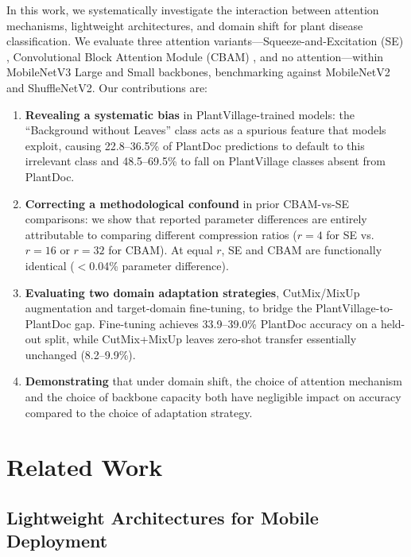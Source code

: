 \documentclass[preprint,12pt]{elsarticle}
\begin{document}
In this work, we systematically investigate the interaction between attention mechanisms, lightweight architectures, and domain shift for plant disease classification. We evaluate three attention variants—Squeeze-and-Excitation (SE) \cite{Hu2018}, Convolutional Block Attention Module (CBAM) \cite{Woo2018}, and no attention—within MobileNetV3 Large and Small backbones, benchmarking against MobileNetV2 and ShuffleNetV2. Our contributions are:

\begin{enumerate}
    \item \textbf{Revealing a systematic bias} in PlantVillage-trained models: the ``Background without Leaves'' class acts as a spurious feature that models exploit, causing 22.8--36.5\% of PlantDoc predictions to default to this irrelevant class and 48.5--69.5\% to fall on PlantVillage classes absent from PlantDoc.
    \item \textbf{Correcting a methodological confound} in prior CBAM-vs-SE comparisons: we show that reported parameter differences are entirely attributable to comparing different compression ratios ($r=4$ for SE vs.\ $r=16$ or $r=32$ for CBAM). At equal $r$, SE and CBAM are functionally identical ($<$0.04\% parameter difference).
    \item \textbf{Evaluating two domain adaptation strategies}, CutMix/MixUp augmentation and target-domain fine-tuning, to bridge the PlantVillage-to-PlantDoc gap. Fine-tuning achieves 33.9--39.0\% PlantDoc accuracy on a held-out split, while CutMix+MixUp leaves zero-shot transfer essentially unchanged (8.2--9.9\%).
    \item \textbf{Demonstrating} that under domain shift, the choice of attention mechanism and the choice of backbone capacity both have negligible impact on accuracy compared to the choice of adaptation strategy.
\end{enumerate}

\section{Related Work}
\label{sec:related}

\subsection{Lightweight Architectures for Mobile Deployment}
\end{document}
